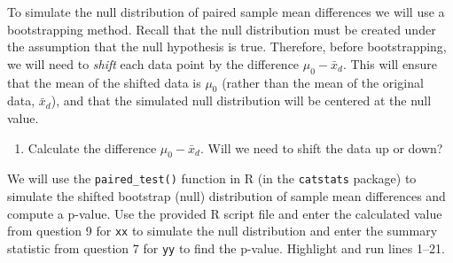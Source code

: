 \documentclass[
]{report}
\newenvironment{Shaded}{\begin{snugshade}}{\end{snugshade}}
\newcommand{\AttributeTok}[1]{\textcolor[rgb]{0.77,0.63,0.00}{#1}}
\newcommand{\CommentTok}[1]{\textcolor[rgb]{0.56,0.35,0.01}{\textit{#1}}}
\newcommand{\DecValTok}[1]{\textcolor[rgb]{0.00,0.00,0.81}{#1}}
\newcommand{\FunctionTok}[1]{\textcolor[rgb]{0.00,0.00,0.00}{#1}}
\newcommand{\NormalTok}[1]{#1}
\newcommand{\SpecialCharTok}[1]{\textcolor[rgb]{0.00,0.00,0.00}{#1}}
\newcommand{\StringTok}[1]{\textcolor[rgb]{0.31,0.60,0.02}{#1}}
\providecommand{\tightlist}{%
  \setlength{\itemsep}{0pt}\setlength{\parskip}{0pt}}
\begin{document}
To simulate the null distribution of paired sample mean differences we will use a bootstrapping method. Recall that the null distribution must be created under the assumption that the null hypothesis is true. Therefore, before bootstrapping, we will need to \emph{shift} each data point by the difference \(\mu_0 - \bar{x}_d\). This will ensure that the mean of the shifted data is \(\mu_0\) (rather than the mean of the original data, \(\bar{x}_d\)), and that the simulated null distribution will be centered at the null value.

\begin{enumerate}
\def\labelenumi{\arabic{enumi}.}
\setcounter{enumi}{8}
\tightlist
\item
  Calculate the difference \(\mu_0 - \bar{x}_d\). Will we need to shift the data up or down?
\end{enumerate}

\vspace{.7in}

We will use the \texttt{paired\_test()} function in R (in the \texttt{catstats} package) to simulate the shifted bootstrap (null) distribution of sample mean differences and compute a p-value. Use the provided R script file and enter the calculated value from question 9 for \texttt{xx} to simulate the null distribution and enter the summary statistic from question 7 for \texttt{yy} to find the p-value. Highlight and run lines 1--21.

\begin{Shaded}
\end{Shaded}
\end{document}
